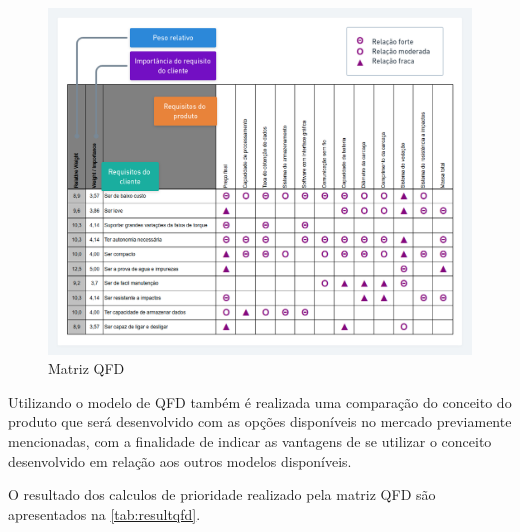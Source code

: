 \begin{figure}[htb]
	\caption{\label{fig:2032} Matriz QFD}
	\begin{center}
		\includegraphics[width=\textwidth]{pictures/2032.png}
	\end{center}
\end{figure}

Utilizando o modelo de QFD também é realizada uma comparação do conceito do produto que será desenvolvido com as opções disponíveis no mercado previamente mencionadas, com a finalidade de indicar as vantagens de se utilizar o conceito desenvolvido em relação aos outros modelos disponíveis.


O resultado dos calculos de prioridade realizado pela matriz QFD são apresentados na \autoref{tab:resultqfd}.


